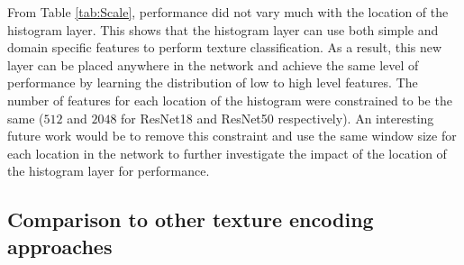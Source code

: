 \documentclass[journal]{IEEEtai}
\begin{document}
	From Table \ref{tab:Scale}, performance did not vary much with the location of the histogram layer. This shows that the histogram layer can use both simple and domain specific features to perform texture classification. As a result, this new layer can be placed anywhere in the network and achieve the same level of performance by learning the distribution of low to high level features. The number of features for each location of the histogram were constrained to be the same ($512$ and $2048$ for ResNet18 and ResNet50 respectively). An interesting future work would be to remove this constraint and use the same window size for each location in the network to further investigate the impact of the location of the histogram layer for performance. 
	\subsection{Comparison to other texture encoding approaches}
\end{document}
